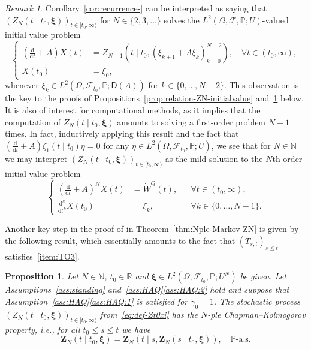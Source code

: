 \documentclass[reqno]{amsart}
\numberwithin{equation}{section}
\newcommand{\bbP}{\mathbb{P}}
\newcommand{\bbR}{\mathbb{R}}
\newcommand{\N}{\mathbb{N}}
\newcommand{\cF}{\mathcal{F}}
\newtheorem{proposition}[lemma]{Proposition}
\theoremstyle{remark}
\newtheorem{remark}[lemma]{Remark}
\theoremstyle{definition}
\begin{document}
%
\begin{remark}\label{rem:relation-ZN-IVP}
	Corollary~\ref{cor:recurrence-} can be interpreted as saying
	that $(Z_{N}(t \mid t_0, \bm\xi))_{t \in [t_0, \infty)}$ for $N \in \{2,3,\dots\}$ solves 
	the $L^2(\Omega, \cF, \bbP; U)$-valued 
	initial value problem
	\begin{equation}
		\left\lbrace
		\begin{aligned}
			\left(\tfrac{\mathrm d}{\mathrm dt} + A\right) X(t) 
			&= Z_{N-1}(t \mid t_0, (\xi_{k+1} + A\xi_{k})_{k=0}^{N-2}), 
			\quad \forall t \in (t_0, \infty), \\
			X(t_0) &= \xi_0,
		\end{aligned}
		\right.
	\end{equation}
	whenever $\xi_k \in L^2(\Omega, \cF_{t_0}, \bbP; \mathsf D(A))$ for $k \in \{0,\dots,N-2\}$. 
	This observation 
	is the key to the proofs of Propositions~\ref{prop:relation-ZN-initialvalue} and~\ref{prop:restart} below.
	It is also of interest for computational methods, as it
	implies that the computation of $Z_{N}(t \mid t_0, \bm\xi)$ amounts to solving 
	a first-order problem $N-1$ times. In fact, inductively applying this result 
	and the fact that 
	$(\tfrac{\mathrm d}{\mathrm dt} + A) \zeta_{1}(t \mid t_0) \eta 
	= 
	0$
	for any $\eta \in L^2(\Omega, \cF_{t_0},\bbP; U)$,
	we see that
	for $N \in \N$ 
	we may interpret $(Z_{N}(t \mid t_0, \bm\xi))_{t \in [t_0, \infty)}$ as the mild solution
	to the $N$th order initial value problem
	\begin{equation}
		\left\lbrace
		\begin{aligned}
			\left(\tfrac{\mathrm d}{\mathrm dt} + A\right)^{N} X(t) &= \dot W^Q(t), &&\forall t \in (t_0, \infty), \\
			\tfrac{\mathrm d^k}{\mathrm dt^k} X(t_0) &= \xi_k, &&\forall k \in \{0, \dots, N-1\}.
		\end{aligned}
		\right.
	\end{equation}
\end{remark}
%
Another key step in the proof of in Theorem~\ref{thm:Nple-Markov-ZN} 
is given by the following result, which essentially amounts to
the fact that $(T_{s,t})_{s \le t}$ satisfies~\ref{item:TO3}.
%
\begin{proposition}\label{prop:restart}
	Let $N \in \N$, $t_0 \in \bbR$ and $\bm\xi \in L^2(\Omega, \cF_{t_0},\bbP; U^{N})$
	be given.
	Let Assumptions~\textup{\ref{ass:standing} and~\ref{ass:HAQ}\ref{ass:HAQ:2}} hold
	and suppose that Assumption~\textup{\ref{ass:HAQ}\ref{ass:HAQ:1}} is satisfied for $\gamma_0 = 1$.
	The stochastic process $(Z_N(t \mid t_0, \bm{\xi}))_{t\in[t_0,\infty)}$ from~\eqref{eq:def-Zt0xi}
	has
	the \emph{$N$-ple Chapman--Kolmogorov property}, i.e.,
	for all $t_0 \le s \le t$ we have
	\begin{equation}\label{eq:Nple-restarting}
		\mathbf Z_N(t \mid t_0, \bm{\xi}) 
		= 
		\mathbf Z_N(t \mid s, \mathbf Z_N(s \mid t_0, \bm\xi) ),
		\quad 
		\bbP\text{-a.s.}
	\end{equation}
\end{proposition}
%
\end{document}
